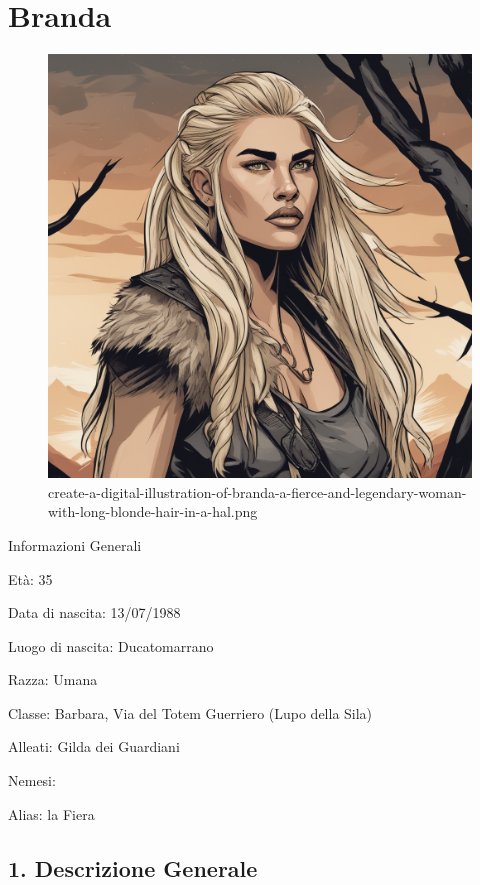 \section{Branda}


\begin{figure}
\centering
\includegraphics{create-a-digital-illustration-of-branda-a-fierce-and-legendary-woman-with-long-blonde-hair-in-a-hal.png}
\caption{create-a-digital-illustration-of-branda-a-fierce-and-legendary-woman-with-long-blonde-hair-in-a-hal.png}
\end{figure}

Informazioni Generali

Età: 35

Data di nascita: 13/07/1988

Luogo di nascita: Ducatomarrano

Razza: Umana

Classe: Barbara, Via del Totem Guerriero (Lupo della Sila)

Alleati: Gilda dei Guardiani

Nemesi:

Alias: la Fiera


\subsection{1. Descrizione Generale}\label{descrizione-generale}


